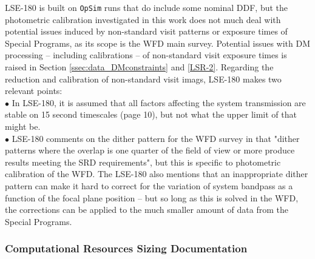 \documentclass[DM,lsstdraft,toc]{lsstdoc}
\begin{document}
LSE-180 is built on {\tt OpSim} runs that do include some nominal DDF, but the photometric calibration investigated in this work does not much deal with potential issues induced by non-standard visit patterns or exposure times of Special Programs, as its scope is the WFD main survey. Potential issues with DM processing -- including calibrations -- of non-standard visit exposure times is raised in Section \ref{ssec:data_DMconstraints} and \ref{LSR-2}. Regarding the reduction and calibration of non-standard visit imags, LSE-180 makes two relevant points: \\
$\bullet$ In LSE-180, it is assumed that all factors affecting the system transmission are stable on 15 second timescales (page 10), but not what the upper limit of that might be. \\
$\bullet$ LSE-180 comments on the dither pattern for the WFD survey in that "dither patterns where the overlap is one quarter of the field of view or more produce results meeting the SRD requirements", but this is specific to photometric calibration of the WFD. The LSE-180 also mentions that an inappropriate dither pattern can make it hard to correct for the variation of system bandpass as a function of the focal plane position -- but so long as this is solved in the WFD, the corrections can be applied to the much smaller amount of data from the Special Programs.


\subsubsection{Computational Resources Sizing Documentation}\label{sssec:dmplans_review_sizing}
\end{document}
